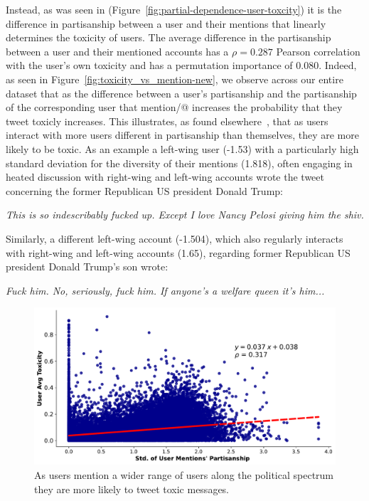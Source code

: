 Instead, as was seen in (Figure~\ref{fig:partial-dependence-user-toxcity}) it is the difference in partisanship between a user and their mentions that linearly determines the toxicity of users. The average difference in the partisanship between a user and their mentioned accounts has a $\rho = 0.287$ Pearson correlation with the user's own toxicity and has a permutation importance of 0.080. Indeed, as seen in Figure~\ref{fig:toxicity_vs_mention-new}, we observe across our entire dataset that as the difference between a user's partisanship and the partisanship of the corresponding user that mention/@ increases the probability that they tweet toxicly increases. This illustrates, as found elsewhere~\cite{hanley2023sub,mamakos2023social}, that as users interact with more users different in partisanship than themselves, they are more likely to be toxic.  As an example a left-wing user (-1.53) with a particularly high standard deviation for the diversity of their mentions (1.818), often engaging in heated discussion with right-wing and left-wing accounts wrote the tweet concerning the former Republican US president Donald Trump:
\begin{displayquote}
\small
\textit{
This is so indescribably fucked up. Except I love Nancy Pelosi giving him the shiv.}
\end{displayquote}
\noindent
Similarly, a different  left-wing account (-1.504), which also regularly interacts with right-wing and left-wing accounts (1.65), regarding former Republican US president Donald Trump's son wrote:
\begin{displayquote}
\small
\textit{
Fuck him. No, seriously, fuck him. If anyone’s a welfare queen it’s him...}
\end{displayquote}
\noindent


\begin{figure}
\begin{minipage}[l]{0.48\textwidth}
\includegraphics[width=1\columnwidth]{figures/toxicity_vs_avg_mention-20240429.pdf}
\end{minipage}
\begin{minipage}[l]{0.33\textwidth}
\caption{As users mention a wider range of users along the political spectrum they are more likely to tweet toxic messages. 
\label{fig:politican-variance-toxicity2}}
\end{minipage}
\end{figure}


